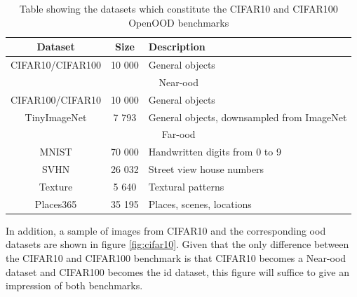 \documentclass[UKenglish]{uiomasterthesis} %
\theoremstyle{definition}
\begin{document}
\begin{table}[hbtp]
\begin{center}
\begin{tabular}{ |c|c|l| } 
    \hline
    Dataset & Size & Description \\
    \hline
    \rowcolor{id!50}
    CIFAR10/CIFAR100 & 10 000 & General objects \\ 
    \hline
    \hline
    \multicolumn{3}{|c|}{Near-\ac{ood}} \\
    \hline
    \rowcolor{near!50}
    CIFAR100/CIFAR10 & 10 000 & General objects \\ 
    \rowcolor{near!50}
    TinyImageNet & 7 793 & General objects, downsampled from ImageNet \\ 
    \hline
    \hline
    \multicolumn{3}{|c|}{Far-\ac{ood}} \\
    \hline
    \rowcolor{far!50}
    MNIST & 70 000 & Handwritten digits from 0 to 9 \\ 
    \rowcolor{far!50}
    SVHN & 26 032 & Street view house numbers \\ 
    \rowcolor{far!50}
    Texture & 5 640 & Textural patterns \\ 
    \rowcolor{far!50}
    Places365 & 35 195 & Places, scenes, locations \\ 
    \hline
    \end{tabular}
    \caption[CIFAR benchmark datasets]{Table showing the datasets which constitute the CIFAR10 and CIFAR100 OpenOOD benchmarks}
    \label{table:cifar10}
\end{center}
\end{table}

In addition, a sample of images from CIFAR10 and the corresponding \ac{ood} datasets are shown in figure \ref{fig:cifar10}. Given that the only difference between the CIFAR10 and CIFAR100 benchmark is that CIFAR10 becomes a Near-\ac{ood} dataset and CIFAR100 becomes the \ac{id} dataset, this figure will suffice to give an impression of both benchmarks.
\end{document}
